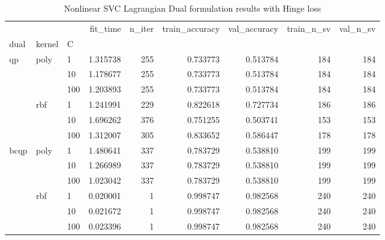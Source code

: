 \begin{table}[H]
\centering
\caption{Nonlinear SVC Lagrangian Dual formulation results with Hinge loss}
\label{nonlinear_lagrangian_dual_svc_cv_results}
\begin{tabular}{lllrrrrrr}
\toprule
     &     &     &  fit\_time &  n\_iter &  train\_accuracy &  val\_accuracy &  train\_n\_sv &  val\_n\_sv \\
dual & kernel & C &           &         &                 &               &             &           \\
\midrule
qp & poly & 1   &  1.315738 &     255 &        0.733773 &      0.513784 &         184 &       184 \\
     &     & 10  &  1.178677 &     255 &        0.733773 &      0.513784 &         184 &       184 \\
     &     & 100 &  1.203893 &     255 &        0.733773 &      0.513784 &         184 &       184 \\
     & rbf & 1   &  1.241991 &     229 &        0.822618 &      0.727734 &         186 &       186 \\
     &     & 10  &  1.696262 &     376 &        0.751255 &      0.503741 &         153 &       153 \\
     &     & 100 &  1.312007 &     305 &        0.833652 &      0.586447 &         178 &       178 \\
bcqp & poly & 1   &  1.480641 &     337 &        0.783729 &      0.538810 &         199 &       199 \\
     &     & 10  &  1.266989 &     337 &        0.783729 &      0.538810 &         199 &       199 \\
     &     & 100 &  1.023042 &     337 &        0.783729 &      0.538810 &         199 &       199 \\
     & rbf & 1   &  0.020001 &       1 &        0.998747 &      0.982568 &         240 &       240 \\
     &     & 10  &  0.021672 &       1 &        0.998747 &      0.982568 &         240 &       240 \\
     &     & 100 &  0.023396 &       1 &        0.998747 &      0.982568 &         240 &       240 \\
\bottomrule
\end{tabular}
\end{table}
